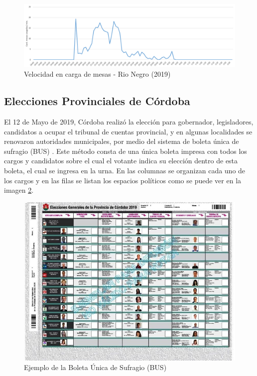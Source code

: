 \begin{figure}[h!]
  \includegraphics[width=1\textwidth]{img/8w25IVQD5U.png}
  \caption{Velocidad en carga de mesas - Rio Negro (2019)}
  \label{graf:velocidadRioNegro}
\end{figure}

\subsection{Elecciones Provinciales de Córdoba}
El 12 de Mayo de 2019, Córdoba realizó la elección para gobernador, legisladores,  candidatos a ocupar el tribunal de cuentas provincial, y en algunas localidades se renovaron autoridades municipales, por medio del sistema de boleta única de sufragio (BUS) \cite{cortiboleta}. Este método consta de una única boleta impresa con todos los cargos y candidatos sobre el cual el votante indica su elección dentro de esta boleta, el cual se ingresa en la urna. En las columnas se organizan cada uno de los cargos y en las filas se listan los espacios políticos como se puede ver en la imagen \ref{graf:BUSCordoba}.
\begin{figure}[h!]
  \includegraphics[width=1\textwidth]{img/boletaunica-cordoba.jpg}
  \caption{Ejemplo de la Boleta Única de Sufragio (BUS)}
  \label{graf:BUSCordoba}
\end{figure}
